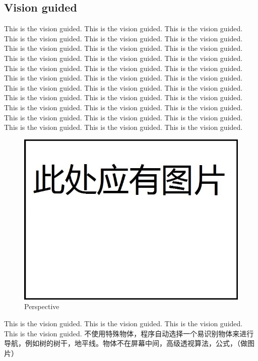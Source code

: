 \documentclass[12pt]{article}
\begin{document}
\begin{flushleft}
\subsection{Vision guided}
This is the vision guided. This is the vision guided. This is the vision guided. This is the vision guided. This is the vision guided. This is the vision guided. This is the vision guided. This is the vision guided. This is the vision guided. This is the vision guided. This is the vision guided. This is the vision guided. This is the vision guided. This is the vision guided. This is the vision guided. This is the vision guided. This is the vision guided. This is the vision guided. This is the vision guided. This is the vision guided. This is the vision guided. This is the vision guided. This is the vision guided. This is the vision guided. This is the vision guided. This is the vision guided. This is the vision guided. This is the vision guided. This is the vision guided. This is the vision guided. This is the vision guided. This is the vision guided. This is the vision guided. 
\begin{figure}[ht!]
	\begin{center}
		\includegraphics[scale = 0.6]{perspective.jpg}
		\caption{Perspective}
	\end{center}
\end{figure}
This is the vision guided. This is the vision guided. This is the vision guided. This is the vision guided. 
不使用特殊物体，程序自动选择一个易识别物体来进行导航，例如树的树干，地平线。物体不在屏幕中间，高级透视算法，公式，（做图片）


\end{flushleft}
\end{document}

